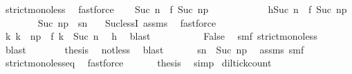 \begin{isabellebody}
\ strict{\isacharunderscore}mono{\isacharunderscore}less\ \isamarkupfalse%
\ fastforce\isanewline
\ \ \isamarkupfalse%
\ {\isacartoucheopen}Suc\ n\ {\isasymle}\ f\ {\isacharparenleft}Suc\ n\isactrlsub p{\isacharparenright}{\isacartoucheclose}\isanewline
\ \ \isamarkupfalse%
\ {\isacharminus}\isanewline
\ \ \ \ \isacommand{{\isacharbraceleft}}\isamarkupfalse%
\ \isamarkupfalse%
\ h{\isacharcolon}{\isacartoucheopen}Suc\ n\ {\isachargreater}\ f\ {\isacharparenleft}Suc\ n\isactrlsub p{\isacharparenright}{\isacartoucheclose}\isanewline
\ \ \ \ \ \ \isamarkupfalse%
\ {\isacartoucheopen}Suc\ n\isactrlsub p\ {\isacharless}\ sn\ \isamarkupfalse%
\ {\isacharasterisk}{\isacharasterisk}\ Suc{\isacharunderscore}lessI\ assms{\isacharparenleft}{}{\isacharparenright}\ \isamarkupfalse%
\ fastforce\isanewline
\ \ \ \ \ \ \isamarkupfalse%
\ {\isacartoucheopen}{\isasymexists}k{\isachardot}\ k\ {\isachargreater}\ n\isactrlsub p\ {\isasymand}\ f\ k\ {\isacharless}\ Suc\ n{\isacartoucheclose}\ \isamarkupfalse%
\ h\ \isamarkupfalse%
\ blast\isanewline
\ \ \ \ \ \ \isamarkupfalse%
\ {\isacharasterisk}\ \isamarkupfalse%
\ False\ \isamarkupfalse%
\ smf\ strict{\isacharunderscore}mono{\isacharunderscore}less\ \isamarkupfalse%
\ blast\isanewline
\ \ \ \ \isacommand{{\isacharbraceright}}\isamarkupfalse%
\ \isamarkupfalse%
\ {\isacharquery}thesis\ \isamarkupfalse%
\ not{\isacharunderscore}less\ \isamarkupfalse%
\ blast\isanewline
\ \ \isamarkupfalse%
\isanewline
\ \ \isamarkupfalse%
\ {\isacartoucheopen}sn\ {\isasymle}\ Suc\ n\isactrlsub p{\isacartoucheclose}\ \isamarkupfalse%
\ assms{\isacharparenleft}{}{\isacharparenright}\ smf\ \isamarkupfalse%
\ strict{\isacharunderscore}mono{\isacharunderscore}less{\isacharunderscore}eq\ \isamarkupfalse%
\ fastforce\isanewline
\ \ \isamarkupfalse%
\ {\isacharasterisk}{\isacharasterisk}\ \isamarkupfalse%
\ {\isacharquery}thesis\ \isamarkupfalse%
\ simp\isanewline
{}\isamarkupfalse%
%
\endisatagproof
{\isafoldproof}%
%
\isadelimproof
\isanewline
%
\endisadelimproof
\isanewline
{}\isamarkupfalse%
\ dil{\isacharunderscore}tick{\isacharunderscore}count{\isacharcolon}\isanewline

\end{isabellebody}
